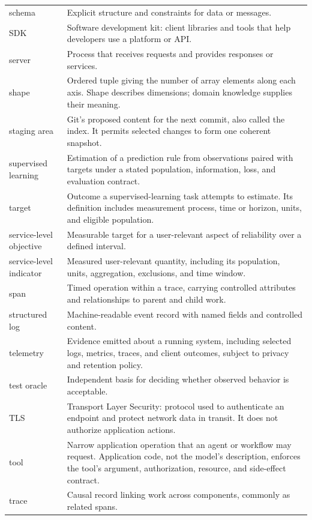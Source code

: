 \begin{longtable}{@{}p{}p{}@{}}
schema & Explicit structure and constraints for data or messages. \\
SDK & Software development kit: client libraries and tools that help developers
use a platform or API. \\
server & Process that receives requests and provides responses or services. \\
shape & Ordered tuple giving the number of array elements along each axis. Shape
describes dimensions; domain knowledge supplies their meaning. \\
staging area & Git's proposed content for the next commit, also called the
index. It permits selected changes to form one coherent snapshot. \\
supervised learning & Estimation of a prediction rule from observations paired
with targets under a stated population, information, loss, and evaluation
contract. \\
target & Outcome a supervised-learning task attempts to estimate. Its
definition includes measurement process, time or horizon, units, and eligible
population. \\
service-level objective & Measurable target for a user-relevant aspect of
reliability over a defined interval. \\
service-level indicator & Measured user-relevant quantity, including its
population, units, aggregation, exclusions, and time window. \\
span & Timed operation within a trace, carrying controlled attributes and
relationships to parent and child work. \\
structured log & Machine-readable event record with named fields and controlled
content. \\
telemetry & Evidence emitted about a running system, including selected logs,
metrics, traces, and client outcomes, subject to privacy and retention policy. \\
test oracle & Independent basis for deciding whether observed behavior is
acceptable. \\
TLS & Transport Layer Security: protocol used to authenticate an endpoint and
protect network data in transit. It does not authorize application actions. \\
tool & Narrow application operation that an agent or workflow may request.
Application code, not the model's description, enforces the tool's argument,
authorization, resource, and side-effect contract. \\
trace & Causal record linking work across components, commonly as related spans. \\

\end{longtable}

